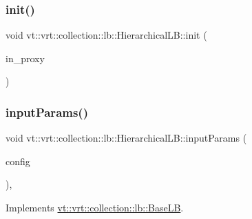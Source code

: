 \subsubsection{\texorpdfstring{init()}{init()}}
{\footnotesize\ttfamily void vt\+::vrt\+::collection\+::lb\+::\+Hierarchical\+L\+B\+::init (\begin{DoxyParamCaption}\item[{\hyperlink{structvt_1_1objgroup_1_1proxy_1_1_proxy}{objgroup\+::proxy\+::\+Proxy}$<$ \hyperlink{structvt_1_1vrt_1_1collection_1_1lb_1_1_hierarchical_l_b}{Hierarchical\+LB} $>$}]{in\+\_\+proxy }\end{DoxyParamCaption})}

\mbox{\label{structvt_1_1vrt_1_1collection_1_1lb_1_1_hierarchical_l_b_a2ef293b1f626aa50e4ac4dd7ed12915c}} 
\subsubsection{\texorpdfstring{input\+Params()}{inputParams()}}
{\footnotesize\ttfamily void vt\+::vrt\+::collection\+::lb\+::\+Hierarchical\+L\+B\+::input\+Params (\begin{DoxyParamCaption}\item[{\hyperlink{structvt_1_1vrt_1_1collection_1_1balance_1_1_config_entry}{balance\+::\+Config\+Entry} $\ast$}]{config }\end{DoxyParamCaption})\hspace{0.3cm}{\ttfamily [override]}, {\ttfamily [virtual]}}



Implements \hyperlink{structvt_1_1vrt_1_1collection_1_1lb_1_1_base_l_b_acf56a0cc29f5e00c0dccf2003baa2f43}{vt\+::vrt\+::collection\+::lb\+::\+Base\+LB}.

\mbox{\label{structvt_1_1vrt_1_1collection_1_1lb_1_1_hierarchical_l_b_a6f030d878c37c7dbca04f71304319930}} 
